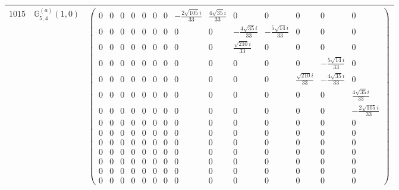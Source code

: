 \documentclass[fleqn,8pt,landscape]{jsarticle}
\begin{document}
\begin{center}
\begin{longtable}{ccc}
$ 1015 $ & $ \mathbb{G}_{5,4}^{(a)}(1,0) $ & $ \begin{pmatrix} 0 & 0 & 0 & 0 & 0 & 0 & 0 & - \frac{2 \sqrt{105} i}{33} & \frac{4 \sqrt{35} i}{33} & 0 & 0 & 0 & 0 & 0 \\ 0 & 0 & 0 & 0 & 0 & 0 & 0 & 0 & 0 & - \frac{4 \sqrt{35} i}{33} & - \frac{5 \sqrt{14} i}{33} & 0 & 0 & 0 \\ 0 & 0 & 0 & 0 & 0 & 0 & 0 & 0 & 0 & \frac{\sqrt{210} i}{33} & 0 & 0 & 0 & 0 \\ 0 & 0 & 0 & 0 & 0 & 0 & 0 & 0 & 0 & 0 & 0 & 0 & - \frac{5 \sqrt{14} i}{33} & 0 \\ 0 & 0 & 0 & 0 & 0 & 0 & 0 & 0 & 0 & 0 & 0 & \frac{\sqrt{210} i}{33} & - \frac{4 \sqrt{35} i}{33} & 0 \\ 0 & 0 & 0 & 0 & 0 & 0 & 0 & 0 & 0 & 0 & 0 & 0 & 0 & \frac{4 \sqrt{35} i}{33} \\ 0 & 0 & 0 & 0 & 0 & 0 & 0 & 0 & 0 & 0 & 0 & 0 & 0 & - \frac{2 \sqrt{105} i}{33} \\ 0 & 0 & 0 & 0 & 0 & 0 & 0 & 0 & 0 & 0 & 0 & 0 & 0 & 0 \\ 0 & 0 & 0 & 0 & 0 & 0 & 0 & 0 & 0 & 0 & 0 & 0 & 0 & 0 \\ 0 & 0 & 0 & 0 & 0 & 0 & 0 & 0 & 0 & 0 & 0 & 0 & 0 & 0 \\ 0 & 0 & 0 & 0 & 0 & 0 & 0 & 0 & 0 & 0 & 0 & 0 & 0 & 0 \\ 0 & 0 & 0 & 0 & 0 & 0 & 0 & 0 & 0 & 0 & 0 & 0 & 0 & 0 \\ 0 & 0 & 0 & 0 & 0 & 0 & 0 & 0 & 0 & 0 & 0 & 0 & 0 & 0 \\ 0 & 0 & 0 & 0 & 0 & 0 & 0 & 0 & 0 & 0 & 0 & 0 & 0 & 0 \end{pmatrix} $ \\ \hline

\end{longtable}
\end{center}
\end{document}
